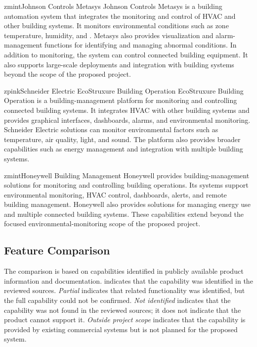 \documentclass[11pt,a4paper]{article}
\begin{document}
\begin{company}{zmint}{Johnson Controls Metasys}
Johnson Controls Metasys is a building automation system that integrates the monitoring and control of HVAC and other building systems. It monitors environmental conditions such as zone temperature, humidity, and \COtwo. Metasys also provides visualization and alarm-management functions for identifying and managing abnormal conditions. In addition to monitoring, the system can control connected building equipment. It also supports large-scale deployments and integration with building systems beyond the scope of the proposed project.
\end{company}

\begin{company}{zpink}{Schneider Electric EcoStruxure Building Operation}
EcoStruxure Building Operation is a building-management platform for monitoring and controlling connected building systems. It integrates HVAC with other building systems and provides graphical interfaces, dashboards, alarms, and environmental monitoring. Schneider Electric solutions can monitor environmental factors such as temperature, air quality, light, and sound. The platform also provides broader capabilities such as energy management and integration with multiple building systems.
\end{company}

\begin{company}{zmint}{Honeywell Building Management}
Honeywell provides building-management solutions for monitoring and controlling building operations. Its systems support environmental monitoring, HVAC control, dashboards, alerts, and remote building management. Honeywell also provides solutions for managing energy use and multiple connected building systems. These capabilities extend beyond the focused environmental-monitoring scope of the proposed project.
\end{company}

\subsection{Feature Comparison}
The comparison is based on capabilities identified in publicly available product information and documentation. \tick{} indicates that the capability was identified in the reviewed sources. \textit{Partial} indicates that related functionality was identified, but the full capability could not be confirmed. \textit{Not identified} indicates that the capability was not found in the reviewed sources; it does not indicate that the product cannot support it. \textit{Outside project scope} indicates that the capability is provided by existing commercial systems but is not planned for the proposed system.
\end{document}
